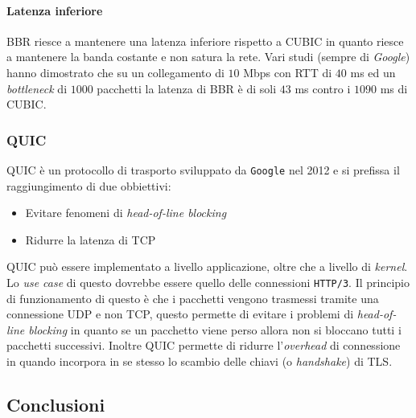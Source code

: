             \paragraph{Latenza inferiore} \Acrshort*{BBR} riesce a mantenere una latenza inferiore rispetto a \Acrshort*{CUBIC} in quanto riesce a mantenere la banda costante e non satura la rete. Vari studi (sempre di \textit{Google}) hanno dimostrato che su un collegamento di $10$ Mbps con \Acrshort*{RTT} di $40$ ms ed un \textit{bottleneck} di $1000$ pacchetti la latenza di \Acrshort*{BBR} è di soli $43$ ms contro i $1090$ ms di \Acrshort*{CUBIC}.
        \subsubsection{\acrfull*{QUIC}}
            \Acrshort*{QUIC} è un protocollo di trasporto sviluppato da \texttt{Google} nel 2012 e si prefissa il raggiungimento di due obbiettivi:\begin{itemize}
                \item Evitare fenomeni di \textit{head-of-line blocking}
                \item Ridurre la latenza di \Acrshort*{TCP}
            \end{itemize}
            \Acrshort*{QUIC} può essere implementato a livello applicazione, oltre che a livello di \textit{kernel}. Lo \textit{use case} di questo dovrebbe essere quello delle connessioni \texttt{\Acrshort*{HTTP}/3}. Il principio di funzionamento di questo è che i pacchetti vengono trasmessi tramite una connessione \Acrshort*{UDP} e non \Acrshort*{TCP}, questo permette di evitare i problemi di \textit{head-of-line blocking} in quanto se un pacchetto viene perso allora non si bloccano tutti i pacchetti successivi. Inoltre \Acrshort*{QUIC} permette di ridurre l'\textit{overhead} di connessione in quando incorpora in se stesso lo scambio delle chiavi (o \textit{handshake}) di \Acrshort*{TLS}.
    \subsection{Conclusioni}
